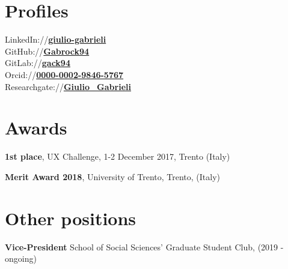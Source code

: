 \documentclass[a4paper]{deedy-resume} %
\begin{document}
\begin{minipage}[t]{0.28\textwidth}
\iffalse
\section{Featured Works}
\vspace{\topsep} %
\begin{tightitemize}
\item \href{http://loveplot.tk}{Loveplots}
\item \href{http://abp.dipsco.unitn.it}{ABP Lab}
\item \href{http://abp.dipsco.unitn.it/iicw}{13th IICW}
\item \href{https://github.com/Gabrock94/Pysiology}{Pysiology}
\item \href{https://github.com/Gabrock94/PrettyWebsite}{PrettyWebsite}
\end{tightitemize}
\sectionspace %
\fi

\section{Profiles}
LinkedIn://\textbf{\href{https://www.linkedin.com/in/giulio-gabrieli-a48b3a73}{giulio-gabrieli}}\\
GitHub://\textbf{\href{https://github.com/Gabrock94}{Gabrock94}}\\
GitLab://\textbf{\href{https://gitlab.com/gack94}{gack94}}\\
Orcid://\textbf{\href{https://orcid.org/0000-0002-9846-5767}{0000-0002-9846-5767}}\\
Researchgate://\textbf{\href{https://www.researchgate.net/profile/Giulio_Gabrieli}{Giulio\_Gabrieli}}\\
\sectionspace %

\section{Awards}
\sectionspace
\begin{tightitemize}
	\item \textbf{1st place}, UX Challenge, 1-2 December 2017, Trento (Italy)
	\item \textbf{Merit Award 2018}, University of Trento, Trento, (Italy)
\end{tightitemize}


\section{Other positions}
\sectionspace
\begin{tightitemize}
	\item \textbf{Vice-President} School of Social Sciences' Graduate Student Club, (2019 - ongoing)
\end{tightitemize}
\end{minipage} %
\end{document}
